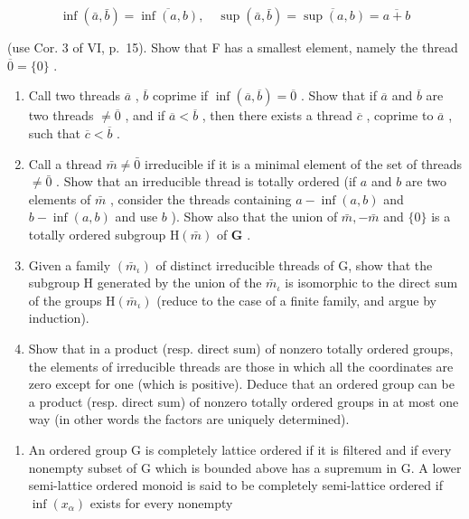 \[
\inf (\bar {a}, \bar {b}) = \overline {{\inf (a , b)}}, \quad \sup (\bar {a}, \bar {b}) = \overline {{\sup (a , b)}} = \overline {{a + b}}
\]

(use Cor. 3 of VI, p.~15). Show that F has a smallest element, namely the thread \(\overline{0} = \{0\}\) .

\begin{enumerate}
\def\labelenumi{\alph{enumi})}
\setcounter{enumi}{2}
\item
  Call two threads \(\overline{a}\) , \(\overline{b}\) coprime if \(\inf (\overline{a},\overline{b}) = \overline{0}\) . Show that if \(\overline{a}\) and \(\overline{b}\) are two threads \(\neq \overline{0}\) , and if \(\overline{a} < \overline{b}\) , then there exists a thread \(\overline{c}\) , coprime to \(\overline{a}\) , such that \(\overline{c} < \overline{b}\) .
\item
  Call a thread \(\bar{m} \neq \bar{0}\) irreducible if it is a minimal element of the set of threads \(\neq \bar{0}\) . Show that an irreducible thread is totally ordered (if \(a\) and \(b\) are two elements of \(\bar{m}\) , consider the threads containing \(a - \inf(a, b)\) and \(b - \inf(a, b)\) and use \(b\) ). Show also that the union of \(\bar{m}, -\bar{m}\) and \(\{0\}\) is a totally ordered subgroup \(\mathrm{H}(\bar{m})\) of \(\mathbf{G}\) .
\item
  Given a family \((\bar{m}_{\iota})\) of distinct irreducible threads of G, show that the subgroup H generated by the union of the \(\bar{m}_{\iota}\) is isomorphic to the direct sum of the groups \(\mathrm{H}(\bar{m}_{\iota})\) (reduce to the case of a finite family, and argue by induction).
\item
  Show that in a product (resp. direct sum) of nonzero totally ordered groups, the elements of irreducible threads are those in which all the coordinates are zero except for one (which is positive). Deduce that an ordered group can be a product (resp. direct sum) of nonzero totally ordered groups in at most one way (in other words the factors are uniquely determined).
\end{enumerate}

\begin{enumerate}
\def\labelenumi{\arabic{enumi})}
\setcounter{enumi}{28}
\tightlist
\item
  An ordered group G is completely lattice ordered if it is filtered and if every nonempty subset of G which is bounded above has a supremum in G. A lower semi-lattice ordered monoid is said to be completely semi-lattice ordered if \(\inf(x_{\alpha})\) exists for every nonempty
\end{enumerate}

